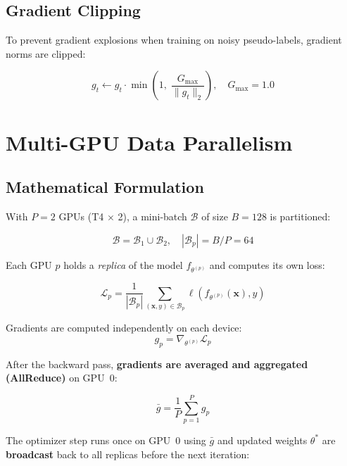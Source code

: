 \documentclass[12pt, a4paper]{article}
\begin{document}
\subsection{Gradient Clipping}

To prevent gradient explosions when training on noisy pseudo-labels, gradient norms are clipped:

\begin{equation}
  g_t \leftarrow g_t \cdot \min\!\left(1,\; \frac{G_{\max}}{\|g_t\|_2}\right), \quad G_{\max} = 1.0
\end{equation}

\section{Multi-GPU Data Parallelism}

\subsection{Mathematical Formulation}

With $P = 2$ GPUs (T4 $\times$ 2), a mini-batch $\mathcal{B}$ of size $B = 128$ is partitioned:

\begin{equation}
  \mathcal{B} = \mathcal{B}_1 \cup \mathcal{B}_2, \quad |\mathcal{B}_p| = B/P = 64
\end{equation}

Each GPU $p$ holds a \emph{replica} of the model $f_{\theta^{(p)}}$ and computes its own loss:

\begin{equation}
  \mathcal{L}_p = \frac{1}{|\mathcal{B}_p|}\sum_{(\mathbf{x},y)\in\mathcal{B}_p} \ell(f_{\theta^{(p)}}(\mathbf{x}), y)
\end{equation}

Gradients are computed independently on each device:
\begin{equation}
  g_p = \nabla_{\theta^{(p)}} \mathcal{L}_p
\end{equation}

After the backward pass, \textbf{gradients are averaged and aggregated (AllReduce)} on GPU~0:

\begin{equation}
  \bar{g} = \frac{1}{P}\sum_{p=1}^{P} g_p
\end{equation}

The optimizer step runs once on GPU~0 using $\bar{g}$ and updated weights $\theta^*$ are \textbf{broadcast} back to all replicas before the next iteration:
\end{document}

